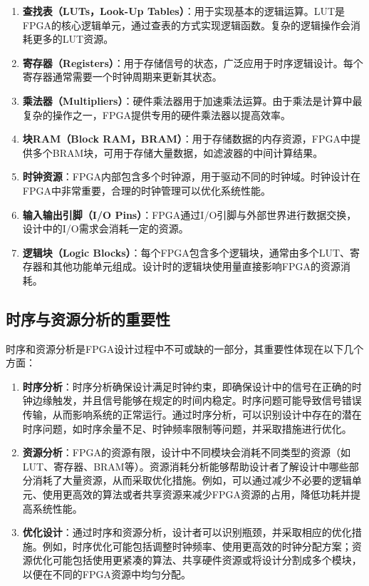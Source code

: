 \begin{enumerate}
    \item \textbf{查找表（LUTs，Look-Up Tables）}：用于实现基本的逻辑运算。LUT是FPGA的核心逻辑单元，通过查表的方式实现逻辑函数。复杂的逻辑操作会消耗更多的LUT资源。
    
    \item \textbf{寄存器（Registers）}：用于存储信号的状态，广泛应用于时序逻辑设计。每个寄存器通常需要一个时钟周期来更新其状态。
    
    \item \textbf{乘法器（Multipliers）}：硬件乘法器用于加速乘法运算。由于乘法是计算中最复杂的操作之一，FPGA提供专用的硬件乘法器以提高效率。
    
    \item \textbf{块RAM（Block RAM，BRAM）}：用于存储数据的内存资源，FPGA中提供多个BRAM块，可用于存储大量数据，如滤波器的中间计算结果。
    
    \item \textbf{时钟资源}：FPGA内部包含多个时钟源，用于驱动不同的时钟域。时钟设计在FPGA中非常重要，合理的时钟管理可以优化系统性能。
    
    \item \textbf{输入输出引脚（I/O Pins）}：FPGA通过I/O引脚与外部世界进行数据交换，设计中的I/O需求会消耗一定的资源。
    
    \item \textbf{逻辑块（Logic Blocks）}：每个FPGA包含多个逻辑块，通常由多个LUT、寄存器和其他功能单元组成。设计时的逻辑块使用量直接影响FPGA的资源消耗。
\end{enumerate}

\subsection{时序与资源分析的重要性}

时序和资源分析是FPGA设计过程中不可或缺的一部分，其重要性体现在以下几个方面：

\begin{enumerate}
    \item \textbf{时序分析}：时序分析确保设计满足时钟约束，即确保设计中的信号在正确的时钟边缘触发，并且信号能够在规定的时间内稳定。时序问题可能导致信号错误传输，从而影响系统的正常运行。通过时序分析，可以识别设计中存在的潜在时序问题，如时序余量不足、时钟频率限制等问题，并采取措施进行优化。
    
    \item \textbf{资源分析}：FPGA的资源有限，设计中不同模块会消耗不同类型的资源（如LUT、寄存器、BRAM等）。资源消耗分析能够帮助设计者了解设计中哪些部分消耗了大量资源，从而采取优化措施。例如，可以通过减少不必要的逻辑单元、使用更高效的算法或者共享资源来减少FPGA资源的占用，降低功耗并提高系统性能。
    
    \item \textbf{优化设计}：通过时序和资源分析，设计者可以识别瓶颈，并采取相应的优化措施。例如，时序优化可能包括调整时钟频率、使用更高效的时钟分配方案；资源优化可能包括使用更紧凑的算法、共享硬件资源或将设计分割成多个模块，以便在不同的FPGA资源中均匀分配。
\end{enumerate}

